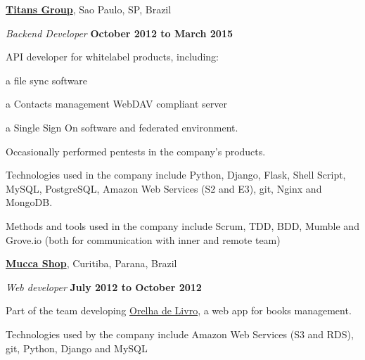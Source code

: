 \documentclass[10pt]{article}
\newenvironment{outerlist}[1][\enskip\textbullet]%
        {\begin{itemize}[#1]}{\end{itemize}%
         \vspace{-.6\baselineskip}}
\newenvironment{innerlist}[1][\enskip\textbullet]%
        {\begin{compactitem}[#1]}{\end{compactitem}}
\newcommand{\blankline}{\quad\pagebreak[2]}
\begin{document}
\href{http://titansgroup.com.br/}{\textbf{Titans Group}},
Sao Paulo, SP, Brazil
\begin{outerlist}

\item[] \textit{Backend Developer}%
        \hfill \textbf{October 2012 to March 2015}
\begin{innerlist}
    \item API developer for whitelabel products, including:
        \begin{innerlist}
            \item a file sync software
            \item a Contacts management WebDAV compliant server
            \item a Single Sign On software and federated environment.
        \end{innerlist}
    \item Occasionally performed pentests in the company's products.

    \item Technologies used in the company include Python, Django, Flask, Shell Script, MySQL, PostgreSQL, Amazon Web Services
    (S2 and E3), git, Nginx and MongoDB.
    \item Methods and tools used in the company include Scrum, TDD, BDD, Mumble and Grove.io (both for communication
    with inner and remote team)
\end{innerlist}

\end{outerlist}

\blankline

\href{http://www.muccashop.com.br/}{\textbf{Mucca Shop}},
Curitiba, Parana, Brazil
\begin{outerlist}

\item[] \textit{Web developer}%
        \hfill \textbf{July 2012 to October 2012}
\begin{innerlist}
    \item Part of the team developing \href{http://www.orelhadelivro.com.br/}{Orelha de Livro}, a web
    app for books management.
    \item Technologies used by the company include Amazon Web Services (S3 and RDS), git, Python, Django and MySQL
\end{innerlist}

\end{outerlist}

\blankline
\end{document}

